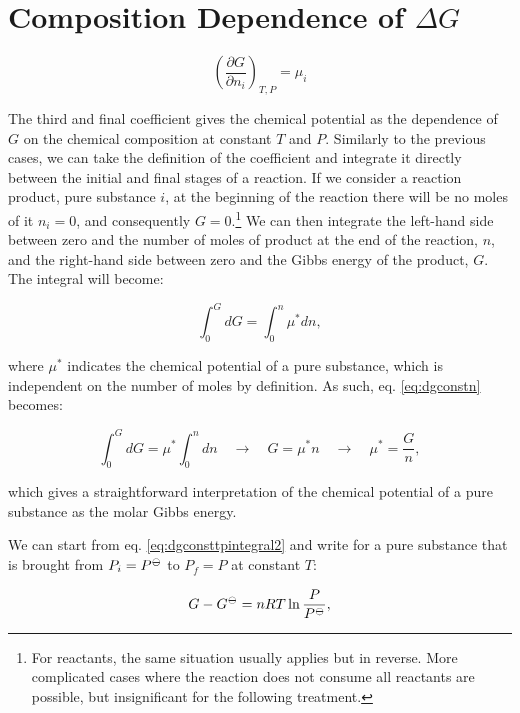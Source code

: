 \documentclass[
  9pt,
]{extbook}
\theoremstyle{definition}
\theoremstyle{definition}
\theoremstyle{definition}
\theoremstyle{definition}
\theoremstyle{remark}
\begin{document}
\section{\texorpdfstring{Composition Dependence of \(\Delta G\)}{Composition Dependence of \textbackslash Delta G}}\label{composition-dependence-of-delta-g}

\[\left(\frac{\partial G}{\partial n_i} \right)_{T,P}=\mu_i\]

The third and final coefficient gives the chemical potential as the dependence of \(G\) on the chemical composition at constant \(T\) and \(P\). Similarly to the previous cases, we can take the definition of the coefficient and integrate it directly between the initial and final stages of a reaction. If we consider a reaction product, pure substance \(i\), at the beginning of the reaction there will be no moles of it \(n_i=0\), and consequently \(G=0\).\footnote{For reactants, the same situation usually applies but in reverse. More complicated cases where the reaction does not consume all reactants are possible, but insignificant for the following treatment.} We can then integrate the left-hand side between zero and the number of moles of product at the end of the reaction, \(n\), and the right-hand side between zero and the Gibbs energy of the product, \(G\). The integral will become:

\begin{equation}
\int_0^G d G = \int_0^n \mu^* dn,
\label{eq:dgconstn}
\end{equation}

where \(\mu^*\) indicates the chemical potential of a pure substance, which is independent on the number of moles by definition. As such, eq. \eqref{eq:dgconstn} becomes:

\begin{equation}
\int_0^G d G = \mu^* \int_0^n dn \quad \rightarrow \quad G = \mu^* n \quad \rightarrow \quad \mu^* = \frac{G}{n},
\label{eq:dgconstn1}
\end{equation}

which gives a straightforward interpretation of the chemical potential of a pure substance as the molar Gibbs energy.

We can start from eq. \eqref{eq:dgconsttpintegral2} and write for a pure substance that is brought from \(P_i=P^{-\kern-6pt{\ominus}\kern-6pt-}\) to \(P_f=P\) at constant \(T\):

\begin{equation}
G - G^{-\kern-6pt{\ominus}\kern-6pt-}= nRT \ln \frac{P}{P^{-\kern-6pt{\ominus}\kern-6pt-}},
\label{eq:dgconstn2}
\end{equation}
\end{document}
